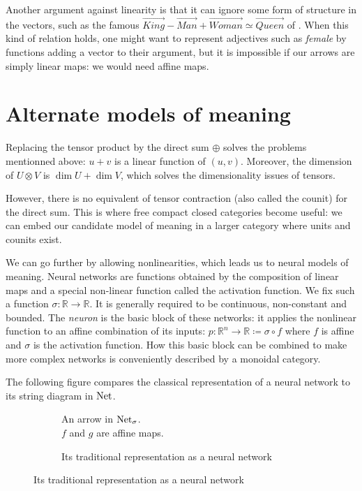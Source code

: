 \documentclass[a4paper,11pt]{article}
\begin{document}
Another argument against linearity is that it can ignore some form
of structure in the vectors, such as the famous $\vec{King} - \vec{Man}
+ \vec{Woman} \simeq \vec{Queen}$ of \cite{mikolov2013efficient}. When this
kind of relation holds, one might want to represent adjectives such as \emph{female}
by functions adding a vector to their argument, but it is
impossible if our arrows are simply linear maps: we would need affine maps.

\section{Alternate models of meaning}

Replacing the tensor product by the direct sum $\oplus$ solves
the problems mentionned above: $u + v$ is a linear function of $(u,v)$.
Moreover, the dimension of $U \otimes V$ is $\dim U + \dim V$,
which solves the dimensionality issues of tensors.

However, there is no equivalent of tensor contraction (also called the counit)
for the direct sum.
This is where free compact closed categories become useful: we can embed
our candidate model of meaning in a larger category where units and counits exist.

We can go further by allowing
nonlinearities, which leads us to neural models of meaning. 
Neural networks are functions obtained by the composition of linear maps
and a special non-linear function called the activation function.  We
fix such a function $\sigma : \mathbb{R} \to \mathbb{R}$. It is
generally required to be continuous, non-constant and bounded.  The
\emph{neuron} is the basic block of these networks: it applies the
nonlinear function to an affine combination of its inputs: $p :
\mathbb{R}^n \to \mathbb{R} \coloneqq \sigma \circ f$ where $f$ is
affine and $\sigma$ is the activation function.  How this basic block
can be combined to make more complex networks is conveniently described
by a monoidal category.

The following figure compares the
classical representation of a neural network to its string diagram in
$\operatorname{Net}$.

\begin{figure}[H]
  \centering
  \begin{subfigure}[b]{0.45\textwidth}
    \caption{An arrow in $\operatorname{Net}_\sigma$. \\ $f$ and $g$ are affine maps.}
    \label{fig:normalform}
  \end{subfigure}
  \begin{subfigure}[b]{0.45\textwidth}
    
    \caption{Its traditional representation as a neural network}
    \label{fig:neuralnet}
  \end{subfigure}
\end{figure}





\end{document}
